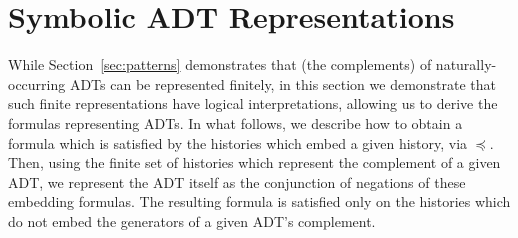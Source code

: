 \section{Symbolic ADT Representations}
\label{sec:formula}

While Section~\ref{sec:patterns} demonstrates that (the complements) of
naturally-occurring ADTs can be represented finitely, in this section we
demonstrate that such finite representations have logical interpretations,
allowing us to derive the formulas representing ADTs. In what follows, we
describe how to obtain a formula which is satisfied by the histories which
embed a given history, via $\preceq$. Then, using the finite set of histories
which represent the complement of a given ADT, we represent the ADT itself as
the conjunction of negations of these embedding formulas. The resulting formula
is satisfied only on the histories which do not embed the generators of a given
ADT’s complement.

